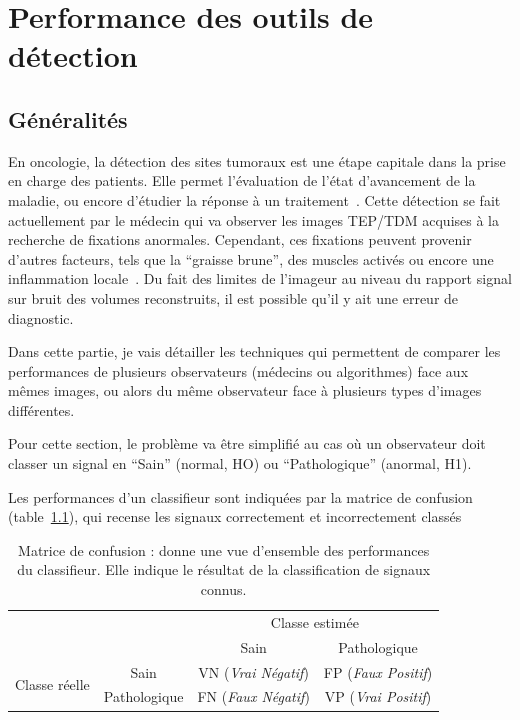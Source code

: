 \chapter{Performance des outils de détection}
\label{lab:chapCAD}
	\section{Généralités}

En oncologie, la détection des sites tumoraux est une étape capitale dans la prise en charge des patients. Elle permet l'évaluation de l'état d'avancement de la maladie, ou encore d'étudier la réponse à un traitement~\cite{dimitrakopoulou2002role}. Cette détection se fait actuellement par le médecin qui va observer les images TEP/TDM acquises à la recherche de fixations anormales. Cependant, ces fixations peuvent provenir d'autres facteurs, tels que la ``graisse brune'', des muscles activés ou encore une inflammation locale~\cite{bordessoule2006impact}. Du fait des limites de l'imageur au niveau du rapport signal sur bruit des volumes reconstruits, il est possible qu'il y ait une erreur de diagnostic.

Dans cette partie, je vais détailler les techniques qui permettent de comparer les performances de plusieurs observateurs (médecins ou algorithmes) face aux mêmes images, ou alors du même observateur face à plusieurs types d'images différentes.

Pour cette section, le problème va être simplifié au cas où un observateur doit classer un signal en ``Sain'' (normal, HO) ou ``Pathologique'' (anormal, H1). 

Les performances d'un classifieur sont indiquées par la matrice de confusion (table~\ref{tab:confusion}), qui recense les signaux correctement et incorrectement classés 

\begin{table}[h]
	\label{tab:confusion}
	\begin{tabular}{cc c|c|}
		& & \multicolumn{2}{c}{Classe estimée} \\
		\cline{3-4}	
		& & \multicolumn{1}{|c|}{Sain} & Pathologique \\ 
		\cline{2-4}
		\multicolumn{1}{c|}{\multirow{2}{*}{Classe réelle}} & \multicolumn{1}{|c|}{Sain} & VN (\emph{Vrai Négatif}) & FP (\emph{Faux Positif})\\
		\cline{2-4}
		\multicolumn{1}{c|}{} & \multicolumn{1}{|c|}{Pathologique} & FN (\emph{Faux Négatif}) & VP (\emph{Vrai Positif})\\
		\cline{2-4}
	\end{tabular}
	\caption{Matrice de confusion : donne une vue d'ensemble des performances du classifieur. Elle indique le résultat de la classification de signaux connus.}
\end{table}

